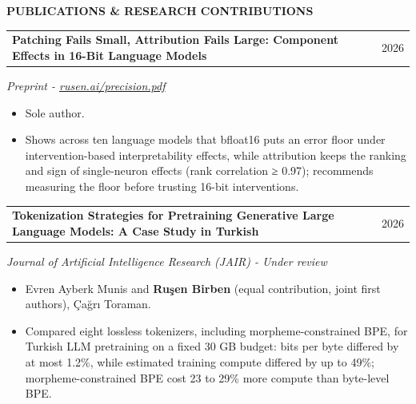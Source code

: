 \documentclass[11pt,a4paper]{article}
\makeatletter
\newcommand{\cvlink}[2]{\href{#1}{\textcolor{linkblue}{#2}}}
\newcommand{\cvsection}[3][5]{%
  \par\Needspace*{#1\baselineskip}\vspace{6pt}%
  {\bfseries\fontsize{11}{13}\selectfont #3}\par\nobreak
  \vspace{3pt}{\color{muted}\hrule height 0.4pt}\nobreak\vspace{6pt}%
}
\newcommand{\cvheading}[2]{%
  \begin{tabularx}{\linewidth}{@{}>{\raggedright\arraybackslash}X@{\hspace{10pt}}r@{}}%
  \textbf{#1} & {\small\color{muted}#2}\\
  \end{tabularx}\par\nobreak
}
\newenvironment{cvpoints}{\begin{itemize}[leftmargin=12pt,itemsep=2pt,topsep=2pt,parsep=0pt]\small}{\end{itemize}}
\makeatother
\begin{document}
\cvsection{}{PUBLICATIONS \& RESEARCH CONTRIBUTIONS}
\begin{minipage}{\linewidth}\raggedright
\cvheading{Patching Fails Small, Attribution Fails Large: Component Effects in 16-Bit Language Models}{2026}
{\small{}\itshape{}\color{muted}Preprint - \cvlink{https://rusen.ai/precision.pdf}{rusen.ai/precision.pdf}}\hfill{\small{}%
%
}\par\vspace{2pt}
\begin{cvpoints}
\item Sole author.
\item Shows across ten language models that bfloat16 puts an error floor under intervention-based interpretability effects, while attribution keeps the ranking and sign of single-neuron effects (rank correlation ≥ 0.97); recommends measuring the floor before trusting 16-bit interventions.
\end{cvpoints}
\end{minipage}\par\vspace{5pt}
\begin{minipage}{\linewidth}\raggedright
\cvheading{Tokenization Strategies for Pretraining Generative Large Language Models: A Case Study in Turkish}{2026}
{\small{}\itshape{}\color{muted}Journal of Artificial Intelligence Research (JAIR) - Under review}\hfill{\small{}%
%
}\par\vspace{2pt}
\begin{cvpoints}
\item Evren Ayberk Munis and \textbf{Ruşen Birben} (equal contribution, joint first authors), Çağrı Toraman.
\item Compared eight lossless tokenizers, including morpheme-constrained BPE, for Turkish LLM pretraining on a fixed 30 GB budget: bits per byte differed by at most 1.2\%, while estimated training compute differed by up to 49\%; morpheme-constrained BPE cost 23 to 29\% more compute than byte-level BPE.
\end{cvpoints}
\end{minipage}\par\vspace{5pt}
\end{document}
